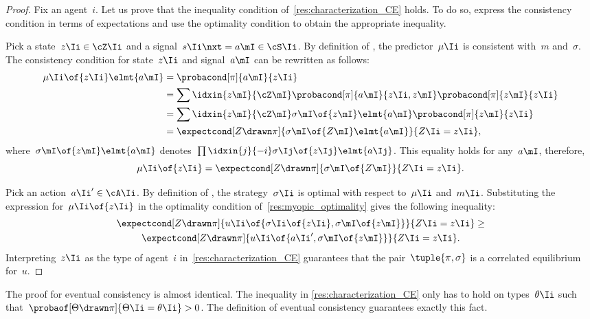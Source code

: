 \begin{proof}
Fix an agent~\(i\).
Let us prove that the inequality condition of~\cref{res:characterization_CE} holds.
To do so, express the consistency condition in terms of expectations and use the optimality condition to obtain the appropriate inequality.

Pick a state~\(z\Ii \in \cZ\Ii\) and a signal~\(s\Ii\nxt = a\mI \in \cS\Ii\).
By definition of , the predictor~\(\mu\Ii\) is consistent with~\(m\) and~\(\sigma\).
The consistency condition for state~\(z\Ii\) and signal~\(a\mI\) can be rewritten as follows:
\begin{align*}
\mu\Ii \of{z\Ii} \elmt{a\mI}
&= \probacond[\pi]{a\mI}{z\Ii} \\
&= \sum\idxin{z\mI}{\cZ\mI} \probacond[\pi]{a\mI}{z\Ii, z\mI} \probacond[\pi]{z\mI}{z\Ii} \\
&= \sum\idxin{z\mI}{\cZ\mI} \sigma\mI \of{z\mI} \elmt{a\mI} \probacond[\pi]{z\mI}{z\Ii} \\
&= \expectcond[Z \drawn \pi]{\sigma\mI \of{Z\mI} \elmt{a\mI}}{Z\Ii = z\Ii}
,
\end{align*}
where~\(\sigma\mI \of{z\mI} \elmt{a\mI}\) denotes~\(\prod\idxin{j}{-i} \sigma\Ij \of{z\Ij} \elmt{a\Ij}\).
This equality holds for any~\(a\mI\), therefore,
\[
\mu\Ii \of{z\Ii} = \expectcond[Z \drawn \pi]{\sigma\mI \of{Z\mI}}{Z\Ii = z\Ii}.
\]

Pick an action~\(a\Ii' \in \cA\Ii\).
By definition of , the strategy~\(\sigma\Ii\) is optimal with respect to~\(\mu\Ii\) and~\(m\Ii\).
Substituting the expression for~\(\mu\Ii \of{z\Ii}\) in the optimality condition of~\cref{res:myopic_optimality} gives the following inequality:
\begin{multline*}
\expectcond[Z \drawn \pi]{u\Ii \of{\sigma\Ii \of{z\Ii}, \sigma\mI \of{z\mI}}}{Z\Ii = z\Ii}
\ge \\
\expectcond[Z \drawn \pi]{u\Ii \of{a\Ii', \sigma\mI \of{z\mI}}}{Z\Ii = z\Ii}
.
\end{multline*}
Interpreting~\(z\Ii\) as the type of agent~\(i\) in~\cref{res:characterization_CE} guarantees that the pair~\(\tuple{\pi, \sigma}\) is a correlated equilibrium for~\(u\).
\end{proof}

The proof for eventual consistency is almost identical.
The inequality in \cref{res:characterization_CE} only has to hold on types~\(\theta\Ii\) such that~\(\probaof[\Theta \drawn \pi]{\Theta\Ii = \theta\Ii} > 0\).
The definition of eventual consistency guarantees exactly this fact.

